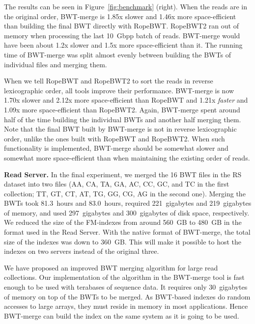\documentclass[smallabstract,smallcaptions]{dccpaper}
\newcommand{\BWT}{\textsf{BWT}}
\newcommand{\BWTmerge}{\textsf{BWT\nobreakdash-merge}}
\newcommand{\ropebwt}{\textsf{RopeBWT}}
\newcommand{\RS}{\textsf{RS}}
\begin{document}
The results can be seen in Figure~\ref{fig:benchmark} (right). When the reads are in the original order, \BWTmerge{} is 1.85x slower and 1.46x more space-efficient than building the final \BWT{} directly with \ropebwt. \ropebwt2{} ran out of memory when processing the last 10~Gbpp batch of reads. \BWTmerge{} would have been about 1.2x slower and 1.5x more space-efficient than it. The running time of \BWTmerge{} was split almost evenly between building the \BWT{}s of individual files and merging them.

When we tell \ropebwt{} and \ropebwt2{} to sort the reads in reverse lexicographic order, all tools improve their performance. \BWTmerge{} is now 1.70x slower and 2.12x more space-efficient than \ropebwt{} and 1.21x \emph{faster} and 1.09x more space-efficient than \ropebwt2. Again, \BWTmerge{} spent around half of the time building the individual \BWT{}s and another half merging them. Note that the final \BWT{} built by \BWTmerge{} is not in reverse lexicographic order, unlike the ones built with \ropebwt{} and \ropebwt2{}. When such functionality is implemented, \BWTmerge{} should be somewhat slower and somewhat more space-efficient than when maintaining the existing order of reads.

\smallbreak\noindent\textbf{Read Server.} In the final experiment, we merged the 16 \BWT{} files in the \RS{} dataset into two files (AA, CA, TA, GA, AC, CC, GC, and TC in the first collection; TT, GT, CT, AT, TG, GG, CG, AG in the second one). Merging the \BWT{}s took 81.3~hours and 83.0~hours, required 221~gigabytes and 219~gigabytes of memory, and used 297~gigabytes and 300~gigabytes of disk space, respectively. We reduced the size of the FM-indexes from around 560~GB to 480~GB in the format used in the Read Server. With the native format of \BWTmerge{}, the total size of the indexes was down to 360~GB. This will make it possible to host the indexes on two servers instead of the original three.



We have proposed an improved \BWT{} merging algorithm for large read collections. Our implementation of the algorithm in the \BWTmerge{} tool is fast enough to be used with terabases of sequence data. It requires only 30~gigabytes of memory on top of the \BWT{}s to be merged. As \BWT-based indexes do random accesses to large arrays, they must reside in memory in most applications. Hence \BWTmerge{} can build the index on the same system as it is going to be used.
\end{document}

